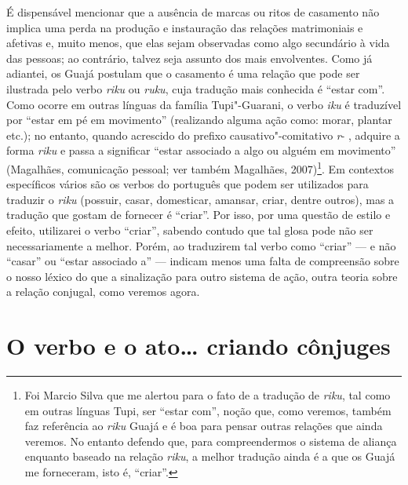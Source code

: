 É dispensável mencionar que a ausência de marcas ou ritos de casamento
não implica uma perda na produção e instauração das relações
matrimoniais e afetivas e, muito menos, que elas sejam observadas como
algo secundário à vida das pessoas; ao contrário, talvez seja assunto
dos mais envolventes. Como já adiantei, os Guajá postulam que o
casamento é uma relação que pode ser ilustrada pelo verbo \emph{riku} ou
\emph{ruku}, cuja tradução mais conhecida é ``estar com''. Como ocorre em
outras línguas da família Tupi"-Guarani, o verbo \emph{iku} é traduzível
por ``estar em pé em movimento'' (realizando alguma ação como: morar,
plantar etc.); no entanto, quando acrescido do prefixo
causativo"-comitativo \emph{r}- , adquire a forma \emph{riku} e passa a
significar ``estar associado a algo ou alguém em movimento'' (Magalhães,
comunicação pessoal; ver também Magalhães, 2007)\footnote{Foi Marcio
  Silva que me alertou para o fato de a tradução de \emph{riku}, tal
  como em outras línguas Tupi, ser ``{estar com}'', noção que, como
  veremos, também faz referência ao \emph{riku} Guajá e é boa para
  pensar outras relações que ainda veremos. No entanto defendo que, para
  compreendermos o sistema de aliança enquanto baseado na relação
  \emph{riku}, a melhor tradução ainda é a que os Guajá me forneceram,
  isto é, ``{criar}''.}. Em contextos específicos vários são os verbos do
português que podem ser utilizados para traduzir o \emph{riku} (possuir,
casar, domesticar, amansar, criar, dentre outros), mas a tradução que
gostam de fornecer é ``criar''. Por isso, por uma questão de estilo e
efeito, utilizarei o verbo ``criar'', sabendo contudo que tal glosa pode
não ser necessariamente a melhor. Porém, ao traduzirem tal verbo como
``criar'' --- e não ``casar'' ou ``estar associado a'' --- indicam menos uma falta
de compreensão sobre o nosso léxico do que a sinalização para outro
sistema de ação, outra teoria sobre a relação conjugal, como veremos
agora.

\section{O verbo e o ato\ldots{} criando
cônjuges}

